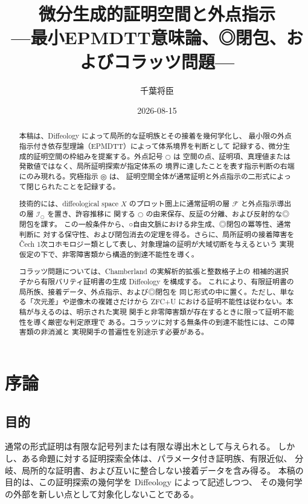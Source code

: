 \documentclass[a4paper,11pt]{ltjsarticle}
\title{微分生成的証明空間と外点指示\\
{\large ---最小EPMDTT意味論、◎閉包、およびコラッツ問題---}}
\author{千葉将臣}
\date{2026-08-15}
\theoremstyle{definition}
\theoremstyle{plain}
\newcommand{\dfix}{\mathord{\text{○}}}
\newcommand{\udfix}{\mathord{\text{◎}}}
\newcommand{\1}{\mathbf{1}}
\begin{document}
\maketitle

\begin{abstract}
本稿は、Diffeology によって局所的な証明族とその接着を幾何学化し、
最小限の外点指示付き依存型理論（EPMDTT）によって体系境界を判断として
記録する、微分生成的証明空間の枠組みを提案する。外点記号 $\dfix$ は
空間の点、証明項、真理値または発散値ではなく、局所証明探索が指定体系の
境界に達したことを表す指示判断の右端にのみ現れる。究極指示 $\udfix$ は、
証明空間全体が通常証明と外点指示の二形式によって閉じられたことを記録する。

技術的には、diffeological space $X$ のプロット圏上に通常証明の層
$\mathcal F$ と外点指示導出の層 $\mathcal I_{\dfix}$ を置き、許容推移に
関する $\dfix$ の由来保存、反証の分離、および反射的な◎閉包を課す。
この一般条件から、○自由文脈における非生成、◎閉包の冪等性、通常判断に
対する保守性、および閉包消去の定理を得る。さらに、局所証明の接着障害を
Čech 1次コホモロジー類として表し、対象理論の証明が大域切断を与えるという
実現仮定の下で、非零障害類から構造的到達不能性を導く。

コラッツ問題については、Chamberland の実解析的拡張と整数格子上の
相補的選択子から有限パリティ証明書の生成 Diffeology を構成する。
これにより、有限証明書の局所族、接着データ、外点指示、および◎閉包を
同じ形式の中に置く。ただし、単なる「次元差」や逆像木の複雑さだけから
ZFC+U における証明不能性は従わない。本稿が与えるのは、明示された実現
関手と非零障害類が存在するときに限って証明不能性を導く厳密な判定原理で
ある。コラッツに対する無条件の到達不能性には、この障害類の非消滅と
実現関手の普遍性を別途示す必要がある。
\end{abstract}

\tableofcontents

\section{序論}

\subsection{目的}

通常の形式証明は有限な記号列または有限な導出木として与えられる。
しかし、ある命題に対する証明探索全体は、パラメータ付き証明族、有限近似、
分岐、局所的な証明書、および互いに整合しない接着データを含み得る。
本稿の目的は、この証明探索の幾何学を Diffeology によって記述しつつ、
その幾何学の外部を新しい点として対象化しないことである。
\end{document}

